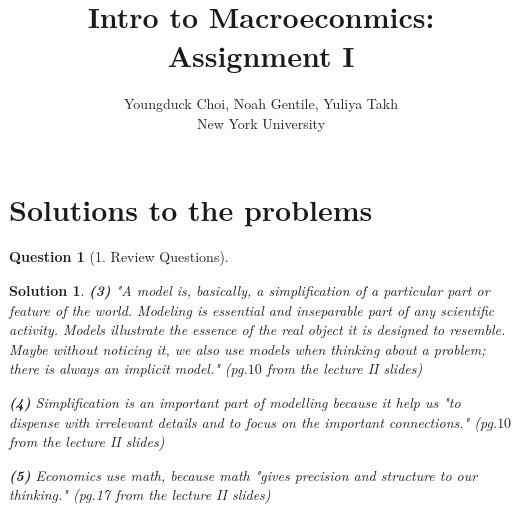 \documentclass{article} %
\title{Intro to Macroeconmics: Assignment I}
\author{
Youngduck Choi, Noah Gentile, Yuliya Takh \\
New York University \\
}
\theoremstyle{quest}
\newtheorem*{question}{Question}
\newtheorem*{solution}{Solution}
\begin{document}
\maketitle

\begin{abstract}
\end{abstract}

\section{Solutions to the problems}

\begin{question}[1. Review Questions]
\end{question}
\begin{solution}

\textbf{(3)}
"A model is, basically, a simplification of a particular part or feature of the world. 
Modeling is essential and inseparable part of any scientific activity. Models illustrate
the essence of the real object it is designed to resemble. Maybe without noticing it, we also
use models when thinking about a problem; there is always an implicit model." 
(pg.$10$ from the lecture II slides) 

\smallskip

\textbf{(4)}
Simplification is an important part of modelling because it help us
"to dispense with irrelevant details and to focus on the important connections." 
(pg.$10$ from the lecture II slides)
\smallskip

\textbf{(5)}
Economics use math, because math "gives precision and structure to our thinking." (pg.17 
from the lecture II slides)
\end{solution}

\bigskip
\end{document}
